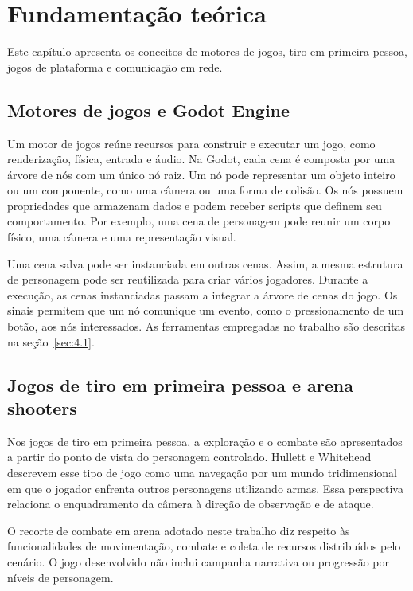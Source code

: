 \chapter{Fundamentação teórica}\label{cap:tcc2-2}

Este capítulo apresenta os conceitos de motores de jogos, tiro em primeira pessoa, jogos de plataforma e comunicação em rede.

\section{Motores de jogos e Godot Engine}\label{sec:2.1}

Um motor de jogos reúne recursos para construir e executar um jogo, como renderização, física, entrada e áudio. Na Godot, cada cena é composta por uma árvore de nós com um único nó raiz. Um nó pode representar um objeto inteiro ou um componente, como uma câmera ou uma forma de colisão. Os nós possuem propriedades que armazenam dados e podem receber scripts que definem seu comportamento. Por exemplo, uma cena de personagem pode reunir um corpo físico, uma câmera e uma representação visual. \cite{GODOT-CONCEITOS}

Uma cena salva pode ser instanciada em outras cenas. Assim, a mesma estrutura de personagem pode ser reutilizada para criar vários jogadores. Durante a execução, as cenas instanciadas passam a integrar a árvore de cenas do jogo. Os sinais permitem que um nó comunique um evento, como o pressionamento de um botão, aos nós interessados. As ferramentas empregadas no trabalho são descritas na seção~\ref{sec:4.1}. \cite{GODOT-CONCEITOS}

\section{Jogos de tiro em primeira pessoa e arena shooters}\label{sec:2.2}

Nos jogos de tiro em primeira pessoa, a exploração e o combate são apresentados a partir do ponto de vista do personagem controlado. Hullett e Whitehead descrevem esse tipo de jogo como uma navegação por um mundo tridimensional em que o jogador enfrenta outros personagens utilizando armas. Essa perspectiva relaciona o enquadramento da câmera à direção de observação e de ataque. \cite{HULLETT}

O recorte de combate em arena adotado neste trabalho diz respeito às funcionalidades de movimentação, combate e coleta de recursos distribuídos pelo cenário. O jogo desenvolvido não inclui campanha narrativa ou progressão por níveis de personagem.


